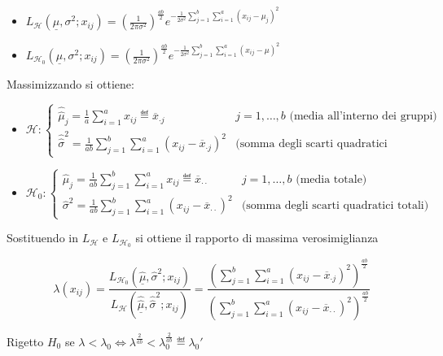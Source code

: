 \documentclass[hidelinks, 10pt]{article}
\begin{document}
\begin{itemize}
\item $ L_{\mathcal{H}} (\underline{\mu}, \sigma^{2}; x_{ij}) = \left( \frac{1}{2 \pi \sigma^{2}} \right)^{\frac{ab}{2}} e^{- \frac{1}{2 \sigma^{2}} \sum\limits_{j = 1}^{b} \sum\limits_{i = 1}^{a} (x_{ij} - \mu_{j})^{2}} $
\item $ L_{\mathcal{H}_{0}} (\underline{\mu}, \sigma^{2}; x_{ij}) = \left( \frac{1}{2 \pi \sigma^{2}} \right)^{\frac{ab}{2}} e^{- \frac{1}{2 \sigma^{2}} \sum\limits_{j = 1}^{b} \sum\limits_{i = 1}^{a} (x_{ij} - \mu)^{2}} $
\end{itemize}

Massimizzando si ottiene:
\begin{itemize}
\item $ \mathcal{H}: \begin{cases} \hat{\hat{\mu}}_{j} = \frac{1}{a} \sum\limits_{i = 1}^{a} x_{ij} \eqdef \overline{x}_{\cdot j} & j = 1, \dotsc, b \text{ (media all'interno dei gruppi)} \\ \hat{\hat{\sigma}}^{2} = \frac{1}{ab} \sum\limits_{j = 1}^{b} \sum\limits_{i = 1}^{a} (x_{ij} - \overline{x}_{\cdot j})^{2} & \text{(somma degli scarti quadratici all'interno dei gruppi)} \end{cases} $
\item $ \mathcal{H}_{0}: \begin{cases} \hat{\mu}_{j} = \frac{1}{ab} \sum\limits_{j = 1}^{b} \sum\limits_{i = 1}^{a} x_{ij} \eqdef \overline{x}_{\cdot \cdot} & j = 1, \dotsc, b \text{ (media totale)} \\ \hat{\sigma}^{2} = \frac{1}{ab} \sum\limits_{j = 1}^{b} \sum\limits_{i = 1}^{a} (x_{ij} - \overline{x}_{\cdot \cdot})^{2} & \text{(somma degli scarti quadratici totali)} \end{cases} $
\end{itemize}

Sostituendo in $ L_{\mathcal{H}} $ e $ L_{\mathcal{H}_{0}} $ si ottiene il rapporto di massima verosimiglianza

\[ \lambda(x_{ij}) = \frac{L_{\mathcal{H}_{0}} (\underline{\hat{\mu}}, \hat{\sigma}^{2}; x_{ij})}{L_{\mathcal{H}} (\hat{\hat{\underline{\mu}}}, \hat{\hat{\sigma}}^{2}; x_{ij})} = \frac{\left( \sum\limits_{j = 1}^{b} \sum\limits_{i = 1}^{a} (x_{ij} - \overline{x}_{\cdot j})^{2} \right)^{\frac{ab}{2}}}{\left( \sum\limits_{j = 1}^{b} \sum\limits_{i = 1}^{a} (x_{ij} - \overline{x}_{\cdot \cdot})^{2} \right)^{\frac{ab}{2}}} \]

Rigetto $ H_{0} $ se $ \lambda < \lambda_{0} \iff \lambda^{\frac{2}{ab}} < \lambda_{0}^{\frac{2}{ab}} \eqdef \lambda_{0}' $
\end{document}

